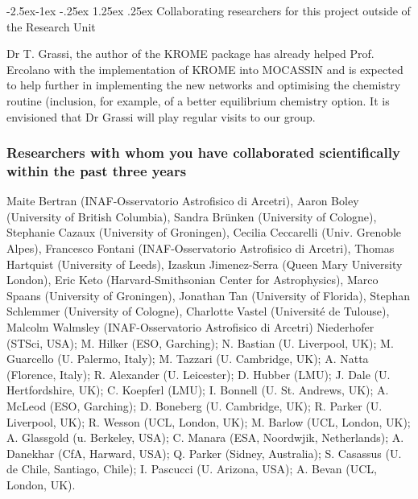 \documentclass[10pt,fleqn,twoside]{article}
\makeatletter
\newcommand{\Tcol}{\color{blue}}
\renewcommand\paragraph{\@startsection{paragraph}{4}{\z@}%
            {-2.5ex\@plus -1ex \@minus -.25ex}%
            {1.25ex \@plus .25ex}%
            {\normalfont\normalsize\bfseries}}
\makeatother
\begin{document}
\paragraph{\Tcol Collaborating researchers for this project outside of
  the Research Unit}

Dr T. Grassi, the author of the KROME package has already helped Prof. Ercolano with the implementation of KROME into MOCASSIN and is expected to help further in implementing the new networks and optimising the chemistry routine (inclusion, for example, of a better equilibrium chemistry option. 
It is envisioned that Dr Grassi will play regular visits to our group.    

\subsubsection{\Tcol Researchers with whom you have collaborated scientifically within the past three years}

Maite Bertran (INAF-Osservatorio Astrofisico di Arcetri), Aaron Boley (University of British Columbia), Sandra Brünken (University of Cologne), Stephanie Cazaux (University of Groningen), Cecilia Ceccarelli (Univ. Grenoble Alpes), Francesco Fontani (INAF-Osservatorio Astrofisico di Arcetri), Thomas Hartquist (University of Leeds), Izaskun Jimenez-Serra (Queen Mary University London), Eric Keto (Harvard-Smithsonian Center for Astrophysics), Marco Spaans (University of Groningen), Jonathan Tan (University of Florida), Stephan Schlemmer (University of Cologne), Charlotte Vastel (Université de Tulouse), Malcolm Walmsley (INAF-Osservatorio Astrofisico di Arcetri)
 Niederhofer (STSci, USA); M. Hilker (ESO, Garching); N. Bastian (U. Liverpool,
UK); M. Guarcello (U. Palermo, Italy); M. Tazzari (U. Cambridge, UK);
A. Natta (Florence, Italy); R. Alexander (U. Leicester); D. Hubber
(LMU); J. Dale (U. Hertfordshire, UK); C. Koepferl (LMU); I. Bonnell
(U. St. Andrews, UK); A. McLeod (ESO, Garching); D. Boneberg
(U. Cambridge, UK); R. Parker (U. Liverpool, UK); R. Wesson (UCL,
London, UK); M. Barlow (UCL, London, UK); A. Glassgold (u. Berkeley,
USA); C. Manara (ESA, Noordwjik, Netherlands); A. Danekhar (CfA,
Harward, USA); Q. Parker (Sidney, Australia); S. Casassus
(U. de Chile, Santiago, Chile); I. Pascucci (U. Arizona, USA);
A. Bevan (UCL, London, UK).
\end{document}
